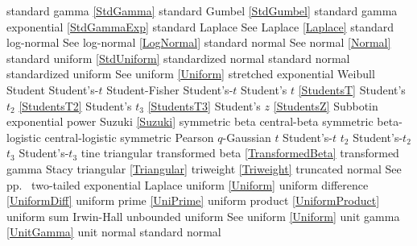 standard gamma 					\dotfill	\eqref{StdGamma} 					\ncite	%
standard Gumbel 				\dotfill	\eqref{StdGumbel} 					\ncite	%
standard gamma exponential		\dotfill	\eqref{StdGammaExp} 				\ncite	%
standard Laplace				\dotfill	See Laplace \eqref{Laplace}			\ncite	%
standard log-normal				\dotfill	See log-normal \eqref{LogNormal} 	\ncite	%
standard normal 				\dotfill	See normal \eqref{Normal} 			\ncite	%
standard uniform				\dotfill	\eqref{StdUniform}					\ncite	%
standardized normal 			\dotfill	standard normal						\ncite	%
standardized uniform 			\dotfill	See uniform \eqref{Uniform}			\ncite	%
stretched exponential 			\dotfill	Weibull 								
Student							\dotfill 	Student's-$t$						\ncite	%
Student-Fisher					\dotfill	Student's-$t$							%
Student's $t$					\dotfill	\eqref{StudentsT}  					\ncite	%
Student's $t_2$					\dotfill	\eqref{StudentsT2}  				\ncite	%
Student's $t_3$					\dotfill	\eqref{StudentsT3}  				\ncite	
Student's $z$					\dotfill	\eqref{StudentsZ}					\ncite	%
Subbotin						\dotfill	exponential power					\ncite
Suzuki							\dotfill	\eqref{Suzuki}						\ncite
symmetric beta					\dotfill	central-beta	 					\ncite	
symmetric beta-logistic			\dotfill	central-logistic					\mcite{\self}
symmetric Pearson				\dotfill	$q$-Gaussian						\mcite{\self}		%
%
$t$								\dotfill	Student's-$t$ 						\ncite	%
$t_2$							\dotfill	Student's-$t_2$ 					\ncite	%
$t_3$							\dotfill	Student's-$t_3$ 					\ncite
tine							\dotfill	triangular							\ncite
transformed beta				\dotfill	\eqref{TransformedBeta} 			\ncite	%
transformed gamma				\dotfill	Stacy 								\ncite %
triangular						\dotfill	\eqref{Triangular}					\ncite
triweight						\dotfill	\eqref{Triweight}					\ncite
truncated normal				\dotfill	See pp.~\pageref{TruncatedNormal}	\ncite
two-tailed exponential			\dotfill	Laplace								\ncite %
%
uniform  						\dotfill	\eqref{Uniform}						\ncite 	%
uniform difference				\dotfill	\eqref{UniformDiff}					\ncite
uniform prime					\dotfill	\eqref{UniPrime}					\mcite{\self}	%
uniform product 				\dotfill	\eqref{UniformProduct}				\ncite 	%
uniform sum						\dotfill	Irwin-Hall					 		\ncite
%
unbounded uniform 				\dotfill	See uniform \eqref{Uniform}			\ncite	%
unit gamma						\dotfill	\eqref{UnitGamma} 					\ncite	%
unit normal						\dotfill	standard normal 					\ncite	%
